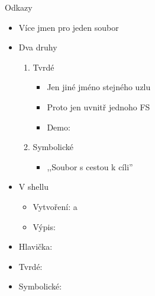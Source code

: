 \begin{frame}{Odkazy}

  \begin{itemize}
    \item Více jmen pro jeden soubor

    \pause

    \item Dva druhy
    \begin{enumerate}
      \item Tvrdé
      \begin{itemize}
	\item Jen jiné jméno stejného uzlu
	\item Proto jen uvnitř jednoho FS
	\item Demo: 
      \end{itemize}

      \pause

      \item Symbolické
      \begin{itemize}
	\item ,,Soubor s cestou k cíli''
      \end{itemize}
    \end{enumerate}

    \pause

    \item V shellu
    \begin{itemize}
      \item Vytvoření:  a 
      \item Výpis: 
    \end{itemize}

    \pause

    \item Hlavička: 
    \item Tvrdé: 
    \item Symbolické: 
  \end{itemize}

\end{frame}

